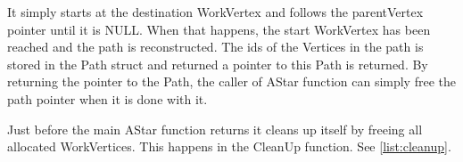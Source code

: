 It simply starts at the destination WorkVertex and follows the parentVertex pointer until it is NULL. When that happens, the start WorkVertex has been reached and the path is reconstructed. The ids of the Vertices in the path is stored in the Path struct and returned a pointer to this Path is returned. By returning the pointer to the Path, the caller of AStar function can simply free the path pointer when it is done with it.

Just before the main AStar function returns it cleans up itself by freeing all allocated WorkVertices. This happens in the CleanUp function. See \cref{list:cleanup}.

